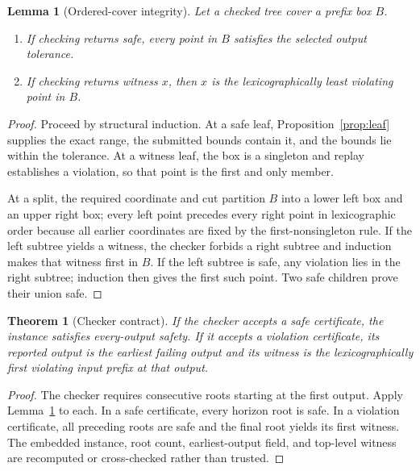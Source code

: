 \documentclass[11pt]{article}
\newtheorem{lemma}[definition]{Lemma}
\newtheorem{theorem}[definition]{Theorem}
\begin{document}
\begin{lemma}[Ordered-cover integrity]\label{lem:cover}
Let a checked tree cover a prefix box $B$.
\begin{enumerate}
\item If checking returns \emph{safe}, every point in $B$ satisfies the selected output tolerance.
\item If checking returns witness $x$, then $x$ is the lexicographically least violating point in $B$.
\end{enumerate}
\end{lemma}
\begin{proof}
Proceed by structural induction. At a safe leaf, Proposition~\ref{prop:leaf} supplies the exact range, the submitted bounds contain it, and the bounds lie within the tolerance. At a witness leaf, the box is a singleton and replay establishes a violation, so that point is the first and only member.

At a split, the required coordinate and cut partition $B$ into a lower left box and an upper right box; every left point precedes every right point in lexicographic order because all earlier coordinates are fixed by the first-nonsingleton rule. If the left subtree yields a witness, the checker forbids a right subtree and induction makes that witness first in $B$. If the left subtree is safe, any violation lies in the right subtree; induction then gives the first such point. Two safe children prove their union safe.
\end{proof}

\begin{theorem}[Checker contract]\label{thm:checker}
If the checker accepts a safe certificate, the instance satisfies every-output safety. If it accepts a violation certificate, its reported output is the earliest failing output and its witness is the lexicographically first violating input prefix at that output.
\end{theorem}
\begin{proof}
The checker requires consecutive roots starting at the first output. Apply Lemma~\ref{lem:cover} to each. In a safe certificate, every horizon root is safe. In a violation certificate, all preceding roots are safe and the final root yields its first witness. The embedded instance, root count, earliest-output field, and top-level witness are recomputed or cross-checked rather than trusted.
\end{proof}
\end{document}
